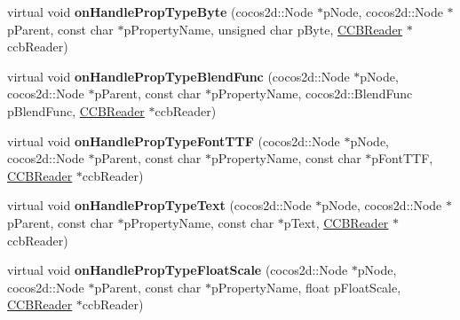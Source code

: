 \begin{DoxyCompactItemize}
\item 
\mbox{\label{classcocosbuilder_1_1LabelTTFLoader_a4a21e1d9be71705c227f875f94316ccc}} 
virtual void {\bfseries on\+Handle\+Prop\+Type\+Byte} (cocos2d\+::\+Node $\ast$p\+Node, cocos2d\+::\+Node $\ast$p\+Parent, const char $\ast$p\+Property\+Name, unsigned char p\+Byte, \hyperlink{classcocosbuilder_1_1CCBReader}{C\+C\+B\+Reader} $\ast$ccb\+Reader)
\item 
\mbox{\label{classcocosbuilder_1_1LabelTTFLoader_a63c4ba843a467dd4d108661d5994ad72}} 
virtual void {\bfseries on\+Handle\+Prop\+Type\+Blend\+Func} (cocos2d\+::\+Node $\ast$p\+Node, cocos2d\+::\+Node $\ast$p\+Parent, const char $\ast$p\+Property\+Name, cocos2d\+::\+Blend\+Func p\+Blend\+Func, \hyperlink{classcocosbuilder_1_1CCBReader}{C\+C\+B\+Reader} $\ast$ccb\+Reader)
\item 
\mbox{\label{classcocosbuilder_1_1LabelTTFLoader_a08e7997dd78f7eb0f4ca2bc7a1d47357}} 
virtual void {\bfseries on\+Handle\+Prop\+Type\+Font\+T\+TF} (cocos2d\+::\+Node $\ast$p\+Node, cocos2d\+::\+Node $\ast$p\+Parent, const char $\ast$p\+Property\+Name, const char $\ast$p\+Font\+T\+TF, \hyperlink{classcocosbuilder_1_1CCBReader}{C\+C\+B\+Reader} $\ast$ccb\+Reader)
\item 
\mbox{\label{classcocosbuilder_1_1LabelTTFLoader_a81c57dbc2d7c91b68aa4d6aa9f1ad33a}} 
virtual void {\bfseries on\+Handle\+Prop\+Type\+Text} (cocos2d\+::\+Node $\ast$p\+Node, cocos2d\+::\+Node $\ast$p\+Parent, const char $\ast$p\+Property\+Name, const char $\ast$p\+Text, \hyperlink{classcocosbuilder_1_1CCBReader}{C\+C\+B\+Reader} $\ast$ccb\+Reader)
\item 
\mbox{\label{classcocosbuilder_1_1LabelTTFLoader_abd5a1761d0b411040a0d0eb72260205c}} 
virtual void {\bfseries on\+Handle\+Prop\+Type\+Float\+Scale} (cocos2d\+::\+Node $\ast$p\+Node, cocos2d\+::\+Node $\ast$p\+Parent, const char $\ast$p\+Property\+Name, float p\+Float\+Scale, \hyperlink{classcocosbuilder_1_1CCBReader}{C\+C\+B\+Reader} $\ast$ccb\+Reader)
\item 
\mbox{\label{classcocosbuilder_1_1LabelTTFLoader_afaa8957528e471126f3480739301302a}} 

\end{DoxyCompactItemize}
